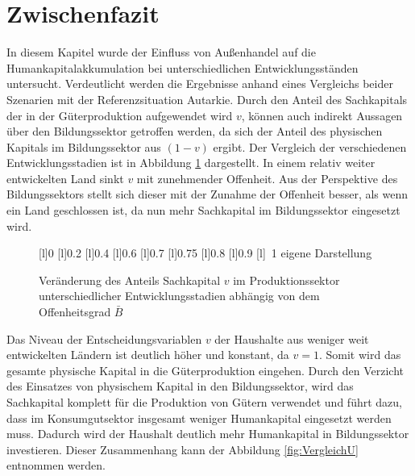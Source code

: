 \section{Zwischenfazit}
In diesem Kapitel wurde der Einfluss von Außenhandel auf die Humankapitalakkumulation bei unterschiedlichen Entwicklungsständen untersucht. Verdeutlicht werden die Ergebnisse anhand eines Vergleichs beider Szenarien mit der Referenzsituation Autarkie. Durch den Anteil des Sachkapitals der in der Güterproduktion aufgewendet wird $v$, können auch indirekt Aussagen über den Bildungssektor getroffen werden, da sich der Anteil des physischen Kapitals im Bildungssektor aus $(1-v)$ ergibt. Der Vergleich der verschiedenen Entwicklungsstadien ist in Abbildung \ref{fig:VergleichV} dargestellt. In einem relativ \textcolor[rgb]{0,0.58,0}{weiter entwickelten Land} sinkt $v$ mit zunehmender Offenheit. Aus der Perspektive des Bildungssektors stellt sich dieser mit der Zunahme der Offenheit besser, als wenn ein Land geschlossen ist, da nun mehr Sachkapital im Bildungssektor eingesetzt wird.\\
%
\begin{figure}[htb] 
\vspace{0.13cm}
 \centering 
		[l]{\footnotesize{0}}
		[l]{\footnotesize{0.2}}
		[l]{\footnotesize{0.4}}
		[l]{\footnotesize{0.6}}
		[l]{\footnotesize{0.7}}
		[l]{\footnotesize{0.75}}
		[l]{\footnotesize{0.8}}
		[l]{\footnotesize{0.9}}
		[l]{~\footnotesize{1}}
	\hfill{}  eigene Darstellung
	\caption{Veränderung des Anteils Sachkapital $v$ im Produktionssektor unterschiedlicher Entwicklungsstadien abhängig von dem Offenheitsgrad $\bar{B}$}
	\label{fig:VergleichV}
\end{figure}
%
Das Niveau der Entscheidungsvariablen $v$ der Haushalte aus \textcolor[rgb]{0.74,0.97,0.22}{weniger weit entwickelten Ländern} ist deutlich höher und konstant, da $v=1$. Somit wird das gesamte physische Kapital in die Güterproduktion eingehen. Durch den Verzicht des Einsatzes von physischem Kapital in den Bildungssektor, wird das Sachkapital komplett für die Produktion von Gütern verwendet und führt dazu, dass im Konsumgutsektor insgesamt weniger Humankapital eingesetzt werden muss. Dadurch wird der Haushalt deutlich mehr Humankapital in Bildungssektor investieren. Dieser Zusammenhang kann der Abbildung \ref{fig:VergleichU} entnommen werden. %
